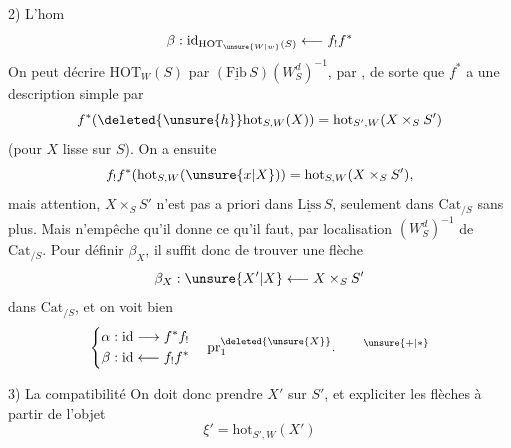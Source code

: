 2) L'hom
\[
 \beta:\mathrm{id}_{\mathrm{HOT}_{\unsure{W|w}}(S)}\longleftarrow f_!f^*
\]
On peut décrire $\mathrm{HOT}_W(S)$ par $(\underline{\mathrm{Fib}}\,S)(W_S^d)^{-1}$,  par , de sorte que $f^*$ a une description simple par
\[
 f^*(\deleted{\unsure{h}}\mathrm{hot}_{S,W}(X))=\mathrm{hot}_{S',W}(X\times_S S')
\]
(pour $X$ lisse sur $S$). On a ensuite
\[
 f_! f^*(\mathrm{hot}_{S,W}(\unsure{x|X}))=\mathrm{hot}_{S,W}(X\times_S S'),
\]
mais attention, $X\times_S S'$ n'est pas a priori dans $\underline{\mathrm{Liss}}\,S$, seulement dans $\mathrm{Cat}_{/S}$ sans plus. Mais  n'empêche qu'il donne ce qu'il faut, par localisation $(W_S^d)^{-1}$ de $\mathrm{Cat}_{/S}$. Pour définir $\beta_X$, il suffit donc de trouver une flèche
\[
 \beta_X:\unsure{X'|X}\longleftarrow X\times_S S'
\]
dans $\mathrm{Cat}_{/S}$, et on voit bien
\[
 \left\{\begin{aligned}
 \alpha &: \mathrm{id}\longrightarrow f^*f_!\\
 \beta &: \mathrm{id}\longleftarrow f_!f^*
 \end{aligned}\right.
 \quad\mathrm{pr}_1^{\deleted{\unsure{X}}}.\qquad{}^{\unsure{+|*}}
\]

3) La compatibilité
On doit donc prendre $X'$ sur $S'$, et  expliciter les flèches à partir de l'objet
\[
 \xi'=\mathrm{hot}_{S',W}(X')
\]
